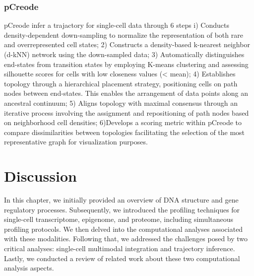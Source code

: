 \subsubsection{pCreode} 

pCreode infer a trajactory for single-cell data through 6 steps i) Conducts density-dependent down-sampling to normalize the representation of both rare and overrepresented cell states; 2) Constructs a density-based k-nearest neighbor (d-kNN) network using the down-sampled data; 3) Automatically distinguishes end-states from transition states by employing K-means clustering and assessing silhouette scores for cells with low closeness values (< mean); 4) Establishes topology through a hierarchical placement strategy, positioning cells on path nodes between end-states. This enables the arrangement of data points along an ancestral continuum; 5) Aligns topology with maximal consensus through an iterative process involving the assignment and repositioning of path nodes based on neighborhood cell densities; 6)Develops a scoring metric within pCreode to compare dissimilarities between topologies facilitating the selection of the most representative graph for visualization purposes.


\section{Discussion}
\label{background:Discussion}
In this chapter, we initially provided an overview of DNA structure and gene regulatory processes. Subsequently, we introduced the profiling techniques for single-cell transcriptome, epigenome, and proteome, including simultaneous profiling protocols. We then delved into the computational analyses associated with these modalities. Following that, we addressed the challenges posed by two critical analyses: single-cell multimodal integration and trajectory inference. Lastly, we conducted a review of related work about these two computational analysis aspects.


